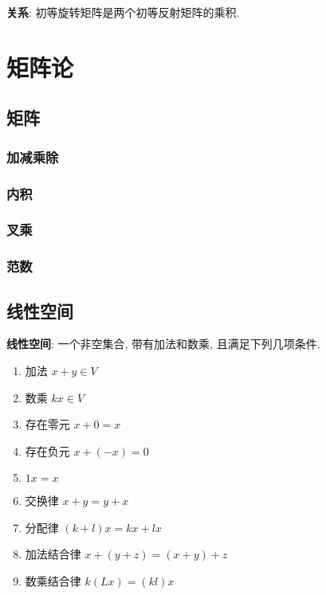 \documentclass{article}
\begin{document}
    \textbf{关系}: 初等旋转矩阵是两个初等反射矩阵的乘积.









\section{矩阵论}
    \subsection{矩阵}
        \subsubsection{加减乘除}

        \subsubsection{内积}

        \subsubsection{叉乘}

        \subsubsection{范数}


    \subsection{线性空间}
        \textbf{线性空间}: 一个非空集合, 带有加法和数乘, 且满足下列几项条件.
            \begin{enumerate}
                \item 加法   $x+y \in V$
                \item 数乘   $k x \in V$
                \item 存在零元 $x+0=x$
                \item 存在负元 $x+(-x) = 0$
                \item $1x = x$
                \item 交换律 $x+y = y+x$
                \item 分配律 $(k+l)x = kx+lx$
                \item 加法结合律 $x+(y+z) = (x+y) +z$
                \item 数乘结合律 $k(Lx) = (kl)x$
            \end{enumerate}
            
\end{document}
